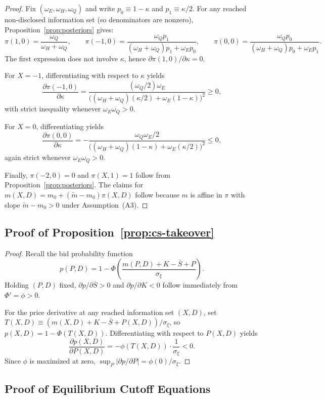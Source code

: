 \documentclass[11pt]{article}
\newcommand{\1}{\mathbf{1}}
\begin{document}
\begin{proof}
Fix $(\omega_E,\omega_H,\omega_Q)$ and write $p_0\equiv 1-\kappa$ and $p_1\equiv \kappa/2$. For any reached non-disclosed information set (so denominators are nonzero), Proposition~\ref{prop:posteriors} gives:
\[
\pi(1,0)=\frac{\omega_Q}{\omega_H+\omega_Q},\qquad
\pi(-1,0)=\frac{\omega_Q p_1}{(\omega_H+\omega_Q)p_1+\omega_E p_0},\qquad
\pi(0,0)=\frac{\omega_Q p_0}{(\omega_H+\omega_Q)p_0+\omega_E p_1}.
\]
The first expression does not involve $\kappa$, hence $\partial \pi(1,0)/\partial\kappa=0$.

For $X=-1$, differentiating with respect to $\kappa$ yields
\[
\frac{\partial \pi(-1,0)}{\partial \kappa}
=\frac{(\omega_Q/2)\omega_E}{\big((\omega_H+\omega_Q)(\kappa/2)+\omega_E(1-\kappa)\big)^2}\ge 0,
\]
with strict inequality whenever $\omega_E\omega_Q>0$.

For $X=0$, differentiating yields
\[
\frac{\partial \pi(0,0)}{\partial \kappa}
=-\frac{\omega_Q\omega_E/2}{\big((\omega_H+\omega_Q)(1-\kappa)+\omega_E(\kappa/2)\big)^2}\le 0,
\]
again strict whenever $\omega_E\omega_Q>0$.

Finally, $\pi(-2,0)=0$ and $\pi(X,1)=1$ follow from Proposition~\ref{prop:posteriors}. The claims for $m(X,D)=m_0+(\tilde m-m_0)\pi(X,D)$ follow because $m$ is affine in $\pi$ with slope $\tilde m-m_0>0$ under Assumption~\textup{(A3)}.
\end{proof}

\subsection{Proof of Proposition~\ref{prop:cs-takeover}}
\label{app:proof-cs-takeover}

\begin{proof}
Recall the bid probability function
\[
p(P,D)=1-\Phi\!\left(\frac{m(P,D)+K-\bar S + P}{\sigma_\xi}\right).
\]
Holding $(P,D)$ fixed, $\partial p/\partial \bar S>0$ and $\partial p/\partial K<0$ follow immediately from $\Phi'=\phi>0$.

For the price derivative at any reached information set $(X,D)$, set $T(X,D)\equiv (m(X,D)+K-\bar S + P(X,D))/\sigma_\xi$, so $p(X,D)=1-\Phi(T(X,D))$. Differentiating with respect to $P(X,D)$ yields
\[
\frac{\partial p(X,D)}{\partial P(X,D)}=-\phi(T(X,D))\cdot\frac{1}{\sigma_\xi}<0.
\]
Since $\phi$ is maximized at zero, $\sup_{P}|\partial p/\partial P|=\phi(0)/\sigma_\xi$.
\end{proof}

\subsection{Proof of Equilibrium Cutoff Equations}
\label{app:proof-cutoff-eqns}
\end{document}
